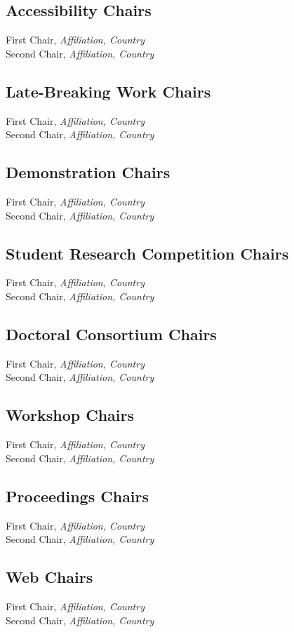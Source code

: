 \subsection{Accessibility Chairs}
First Chair, \emph{Affiliation, Country}\\
Second Chair, \emph{Affiliation, Country}


\subsection{Late-Breaking Work Chairs}
First Chair, \emph{Affiliation, Country}\\
Second Chair, \emph{Affiliation, Country}

\subsection{Demonstration Chairs}
First Chair, \emph{Affiliation, Country}\\
Second Chair, \emph{Affiliation, Country}

\subsection{Student Research Competition Chairs}
First Chair, \emph{Affiliation, Country}\\
Second Chair, \emph{Affiliation, Country}

\subsection{Doctoral Consortium Chairs}
First Chair, \emph{Affiliation, Country}\\
Second Chair, \emph{Affiliation, Country}

\subsection{Workshop Chairs}
First Chair, \emph{Affiliation, Country}\\
Second Chair, \emph{Affiliation, Country}

\subsection{Proceedings Chairs}
First Chair, \emph{Affiliation, Country}\\
Second Chair, \emph{Affiliation, Country}

\subsection{Web Chairs}
First Chair, \emph{Affiliation, Country}\\
Second Chair, \emph{Affiliation, Country}

